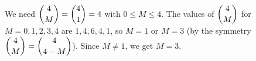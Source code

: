 We need $\dbinom{4}{M}=\dbinom{4}{1}=4$ with $0\le M\le4$. The values of $\dbinom{4}{M}$ for $M=0,1,2,3,4$ are $1,4,6,4,1$, so $M=1$ or $M=3$ (by the symmetry $\dbinom{4}{M}=\dbinom{4}{4-M}$). Since $M\ne1$, we get $M=\boxed{3}$.
